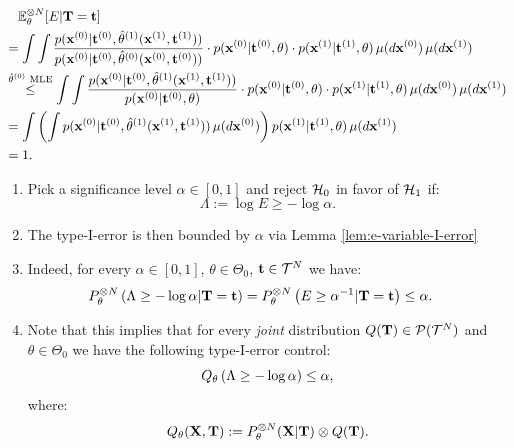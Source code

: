 \begin{Prn}
\begin{enumerate}
    \end{enumerate}
    \begin{align*}
        &\quad \mathbb{E}_\theta^{\otimes N}[E|\mathbf{T}=\mathbf{t}] \\ 
        & = \int\int \frac{p(\mathbf{x}^{(0)}|\mathbf{t}^{(0)},\hat \theta^{(1)}(\mathbf{x}^{(1)},\mathbf{t}^{(1)}))}{p(\mathbf{x}^{(0)}|\mathbf{t}^{(0)},\hat \theta^{(0)}(\mathbf{x}^{(0)},\mathbf{t}^{(0)}))} \cdot p(\mathbf{x}^{(0)}|\mathbf{t}^{(0)},\theta)\cdot p(\mathbf{x}^{(1)}|\mathbf{t}^{(1)},\theta) \,\mu(d\mathbf{x}^{(0)})\,\mu(d\mathbf{x}^{(1)}) \\ 
        & \stackrel{\hat \theta^{(0)} \text{ MLE}}{\le} \int\int \frac{p(\mathbf{x}^{(0)}|\mathbf{t}^{(0)},\hat \theta^{(1)}(\mathbf{x}^{(1)},\mathbf{t}^{(1)}))}{p(\mathbf{x}^{(0)}|\mathbf{t}^{(0)},\theta)} \cdot p(\mathbf{x}^{(0)}|\mathbf{t}^{(0)},\theta)\cdot p(\mathbf{x}^{(1)}|\mathbf{t}^{(1)},\theta) \,\mu(d\mathbf{x}^{(0)})\,\mu(d\mathbf{x}^{(1)}) \\ 
        & =  \int \left (\int p(\mathbf{x}^{(0)}|\mathbf{t}^{(0)},\hat \theta^{(1)}(\mathbf{x}^{(1)},\mathbf{t}^{(1)})) \,\mu(d\mathbf{x}^{(0)}) \right ) p(\mathbf{x}^{(1)}|\mathbf{t}^{(1)},\theta) \,\mu(d\mathbf{x}^{(1)}) \\
        & =1.
    \end{align*}
    \begin{enumerate}[resume]
\item Pick a significance level $\alpha \in [0,1]$ and reject $\mathcal{H}_0$ in favor of $\mathcal{H}_1$ if:
         \[ \Lambda:=\log E \ge - \log \alpha. \] 
 \item The type-I-error is then bounded by $\alpha$ via Lemma \ref{lem:e-variable-I-error} 
\item[]  Indeed, for every $\alpha \in [0,1]$, $\theta \in \Theta_0$, $\mathbf{t} \in \mathcal{T}^N$ we have: 
         \begin{align*} 
             P_\theta^{\otimes N}\lp \Lambda \ge - \log \alpha |\Tbf=\tbf  \rp 
             &= P_\theta^{\otimes N} \lp E \ge \alpha^{-1} |\Tbf=\tbf \rp \le \alpha. %
         \end{align*}
\item[] Note that this implies that for every \emph{joint} distribution
    $Q(\mathbf{T}) \in \mathcal{P}(\mathcal{T}^N)$ and $\theta \in \Theta_0$ we have the following type-I-error control:
    \[ Q_\theta \left ( \Lambda \ge - \log \alpha  \right ) \le \alpha, \]
    where:
    \[ Q_\theta(\mathbf{X},\mathbf{T}) := P_\theta^{\otimes N}(\mathbf{X}|\mathbf{T}) \otimes Q(\mathbf{T}).\]
    \end{enumerate}
\end{Prn}

